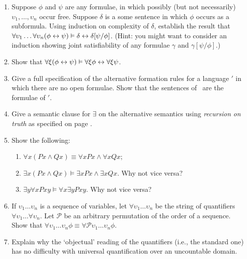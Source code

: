 {\begin{enumerate}
\begin{enumerate}
	\item If $\Gamma\vDash$ then $\Gamma[\tau/\theta]\vDash$.
\end{enumerate}
\item 	Suppose $\phi$ and $\psi$ are any formulae, in which possibly (but not necessarily) $\upsilon_{1},\ldots,\upsilon_{n}$ occur free. Suppose $\delta$ is a some sentence in which $\phi$ occurs as a subformula.  Using induction on complexity of $\delta$, establish the result that  $\forall\upsilon_{1}\ldots\forall\upsilon_{n}(\phi\leftrightarrow\psi)\vDash \delta \leftrightarrow \delta[\psi/\phi]$. (Hint: you might want to consider an induction showing joint satisfiability of any formulae $\gamma$ and $\gamma[\psi/\phi]$.)
\item Show that $\forall\xi(\phi\leftrightarrow\psi)\vDash\forall\xi\phi\leftrightarrow\forall\xi\psi$. 
\item Give a full specification of the alternative formation rules for a language \ltwo$'$ in which there are no open formulae. Show that the sentences of \ltwo\ are the formulae of \ltwo$'$.
\item Give a semantic clause for $\exists$ on the alternative semantics using \emph{recursion on truth} as specified on page \pageref{fiverectr}.
\item Show the following: \begin{enumerate}
	\item $\forall x (Px \wedge Qx) \equiv \forall x Px \wedge \forall x Qx$;
	\item $\exists x (Px \wedge Qx) \vDash \exists x Px \wedge \exists x Qx$. Why not vice versa?
	\item $\exists y \forall x Pxy \vDash \forall x \exists y Pxy$. Why not vice versa?
\end{enumerate}
\item If $\upsilon_{1}\ldots\upsilon_{n}$ is a sequence of variables, let $\forall \upsilon_{1}\ldots\upsilon_{n}$ be the string of quantifiers $\forall\upsilon_{1}\ldots\forall\upsilon_{n}$. Let $\mathcal{P}$ be an arbitrary permutation of the order of a sequence. Show that $\forall \upsilon_{1}\ldots\upsilon_{n} \phi \equiv \forall\mathcal{P}\upsilon_{1}\ldots\upsilon_{n} \phi$.
\item Explain why the `objectual' reading of the quantifiers (i.e., the standard one) has no difficulty with universal quantification over an uncountable domain.
\end{enumerate}

}







